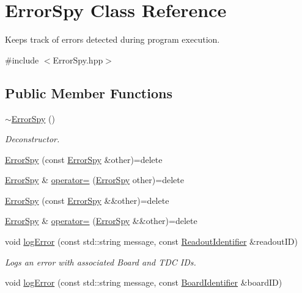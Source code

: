 \hypertarget{class_error_spy}{}\section{Error\+Spy Class Reference}
\label{class_error_spy}


Keeps track of errors detected during program execution.  




{\ttfamily \#include $<$Error\+Spy.\+hpp$>$}

\subsection*{Public Member Functions}
\begin{DoxyCompactItemize}
\item 
\hyperlink{class_error_spy_aa9afe918ddadd03debbbbae613c89e74}{$\sim$\+Error\+Spy} ()
\begin{DoxyCompactList}\small\item\em Deconstructor. \end{DoxyCompactList}\item 
\hyperlink{class_error_spy_aa10c8604df16528fa51fc00e9b84e184}{Error\+Spy} (const \hyperlink{class_error_spy}{Error\+Spy} \&other)=delete
\item 
\hyperlink{class_error_spy}{Error\+Spy} \& \hyperlink{class_error_spy_a1ee5e050efa950d40f48245550cb5aad}{operator=} (\hyperlink{class_error_spy}{Error\+Spy} other)=delete
\item 
\hyperlink{class_error_spy_a07d843cb06eb0a6bfd47734b6c31e289}{Error\+Spy} (const \hyperlink{class_error_spy}{Error\+Spy} \&\&other)=delete
\item 
\hyperlink{class_error_spy}{Error\+Spy} \& \hyperlink{class_error_spy_a1a48d70388ccb40d03357ce9f93158c9}{operator=} (\hyperlink{class_error_spy}{Error\+Spy} \&\&other)=delete
\item 
void \hyperlink{class_error_spy_af415d2e53a4465983a98ee14f653a0fa}{log\+Error} (const std\+::string message, const \hyperlink{class_readout_identifier}{Readout\+Identifier} \&readout\+ID)
\begin{DoxyCompactList}\small\item\em Logs an error with associated Board and T\+DC I\+Ds. \end{DoxyCompactList}\item 
void \hyperlink{class_error_spy_a64883d689d048728db1193b8b60211b4}{log\+Error} (const std\+::string message, const \hyperlink{class_board_identifier}{Board\+Identifier} \&board\+ID)

\end{DoxyCompactItemize}
